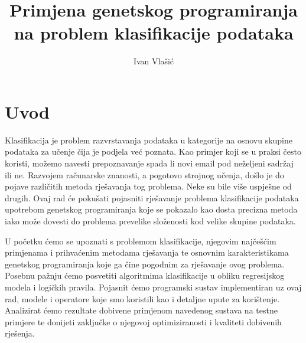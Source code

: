 \documentclass[times, utf8, zavrsni]{fer}
\begin{document}

\title{Primjena genetskog programiranja na problem klasifikacije podataka}

\author{Ivan Vlašić}

\maketitle

\izvornik


\tableofcontents

\chapter{Uvod}
Klasifikacija je problem razvrstavanja podataka u kategorije na osnovu skupine podataka za učenje čija je podjela već poznata. Kao primjer koji se u praksi često koristi, možemo navesti prepoznavanje spada li novi email pod neželjeni sadržaj ili ne. Razvojem računarske znanosti, a pogotovo strojnog učenja, došlo je do pojave različitih metoda rješavanja tog problema. Neke su bile više uspješne od drugih. Ovaj rad će pokušati pojasniti rješavanje problema klasifikacije podataka upotrebom genetskog programiranja koje se pokazalo kao dosta precizna metoda iako može dovesti do problema prevelike složenosti kod velike skupine podataka.

U početku ćemo se upoznati s problemom klasifikacije, njegovim najčešćim primjenama i prihvaćenim metodama rješavanja te osnovnim karakteristikama genetskog programiranja koje ga čine pogodnim za rješavanje ovog problema. Posebnu pažnju ćemo posvetiti algoritmima klasifikacije u obliku regresijskog modela i logičkih pravila. Pojasnit ćemo programski sustav implementiran uz ovaj rad, modele i operatore koje smo koristili kao i detaljne upute za korištenje. Analizirat ćemo rezultate dobivene primjenom navedenog sustava na testne primjere te donijeti zaključke o njegovoj optimiziranosti i kvaliteti dobivenih rješenja.
\end{document}
